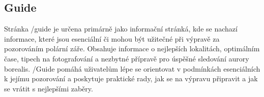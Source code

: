 \subsection{Guide}

\par Stránka /guide je určena primárně jako informační stránká, kde se nachazí informace, které jsou esenciální či mohou být užitečné při výpravě za pozorováním polární záře. Obsahuje informace o nejlepších lokalitách, optimálním čase, tipech na fotografování a nezbytné přípravě pro úspěšné sledování aurory borealis. /Guide pomáhá uživatelům lépe se orientovat v podmínkách esenciálních k jejímu pozorování a poskytuje praktické rady, jak se na výpravu připravit a jak se vrátit s nejlepšími zaběry. 